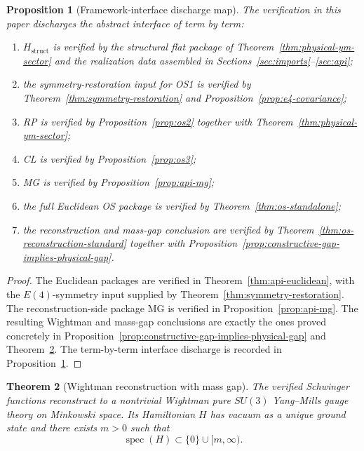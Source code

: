 \documentclass[11pt]{article}
\newtheorem{theorem}{Theorem}[section]
\newtheorem{proposition}[theorem]{Proposition}
\theoremstyle{definition}
\theoremstyle{remark}
\newcommand{\spec}{\operatorname{spec}}
\begin{document}
\begin{proposition}[Framework-interface discharge map]
\label{prop:framework-discharge-map}
The verification in this paper discharges the abstract interface of
\cite{axioms} term by term:
\begin{enumerate}[label=\textnormal{(\roman*)},leftmargin=1.5em]
\item \(H_{\mathrm{struct}}\) is verified by the structural flat package of
Theorem~\ref{thm:physical-ym-sector} and the realization data assembled in
Sections~\ref{sec:imports}--\ref{sec:api};
\item the symmetry-restoration input for OS1 is verified by
Theorem~\ref{thm:symmetry-restoration} and Proposition~\ref{prop:e4-covariance};
\item RP is verified by Proposition~\ref{prop:os2} together with
Theorem~\ref{thm:physical-ym-sector};
\item CL is verified by Proposition~\ref{prop:os3};
\item MG is verified by Proposition~\ref{prop:api-mg};
\item the full Euclidean OS package is verified by Theorem~\ref{thm:os-standalone};
\item the reconstruction and mass-gap conclusion are verified by
Theorem~\ref{thm:os-reconstruction-standard} together with
Proposition~\ref{prop:constructive-gap-implies-physical-gap}.
\end{enumerate}
\end{proposition}

\begin{proof}
The Euclidean packages are verified in
Theorem~\ref{thm:api-euclidean}, with the \(E(4)\)-symmetry input supplied by
Theorem~\ref{thm:symmetry-restoration}.  The reconstruction-side package MG is
verified in Proposition~\ref{prop:api-mg}.  The resulting Wightman and
mass-gap conclusions are exactly the ones proved concretely in
Proposition~\ref{prop:constructive-gap-implies-physical-gap} and
Theorem~\ref{thm:wightman-gap}.  The term-by-term interface discharge is
recorded in Proposition~\ref{prop:framework-discharge-map}.
\end{proof}

\begin{theorem}[Wightman reconstruction with mass gap]
\label{thm:wightman-gap}
The verified Schwinger functions reconstruct to a nontrivial Wightman
pure $SU(3)$ Yang--Mills gauge theory on Minkowski space.
Its Hamiltonian $H$ has vacuum as a unique ground state and there exists
$m>0$ such that
\[
\spec(H)\subset\{0\}\cup[m,\infty).
\]
\end{theorem}
\end{document}
